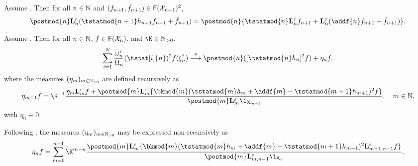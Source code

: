 \begin{lemma} \label{eq:critical:identity}
Assume . Then for all $n \in \mathbb{N}$ and $(f_{n + 1}, \tilde{f}_{n + 1}) \in \mathsf{F}(\mathcal{X}_{n + 1})^2$, 
$$
\postmod{n} \ukmod{n}(\tstatmod{n + 1} h_{n + 1} f_{n + 1} + \ftd{n + 1}) = \postmod{n}\{\tstatmod{n} \ukmod{n} f_{n + 1} + \ukmod{n} (\addf{n} f_{n + 1} + \ftd{n + 1})\}. 
$$
\end{lemma}

\begin{lemma}
\label{lem:hoeffding:tau:square}
Assume . Then for all $n \in \mathbb{N}$, $f \in \mathsf{F}(\mathcal{X}_n)$, and $\K \in \nsetpos$, 
\[
\sum_{i = 1}^\N \frac{\ewght{n}{i}}{\sumwght{n}}(\tstat[i]{n})^2 f(\epart{n}{i}) \pplim \postmod{n}([\tstatmod{n} h_n]^2 f) + \eta_n f, 
\]
where the measures $(\eta_m)_{m \in \mathbb{N}_{> 0}}$ are defined recursively as 
\[
\eta_{m + 1} f = \K^{-1} \frac{\eta_m \ukmod{m} f +  \postmod{m} \ukmod{m} \{ \bkmod{m}(\tstatmod{m} h_m + \addf{m} - \tstatmod{m + 1} h_{m + 1})^2 f \}}{\postmod{m} \ukmod{m} \1_{\Xset_{m + 1}}}, \quad m \in \nset, 
\]
with $\eta_0 \equiv 0$. 
\end{lemma}

Following \cite[Lemma~13]{olsson:westerborn:2017}, the measures $(\eta_m)_{m \in \mathbb{N}_{> 0}}$ may be expressed non-recursively as
\begin{equation}
\label{eq:def:etak}
\eta_n f = \sum_{m = 0}^{n - 1} \K^{m - n} \frac{\postmod{m} \ukmod{m} \{ \bkmod{m}(\tstatmod{m} h_m + \addf{m} - \tstatmod{m + 1} h_{m + 1})^2 \ukmod{m + 1, n - 1} f \}}{\postmod{m} \ukmod{m, n - 1} \1_{\Xset_n}}.
\end{equation}

